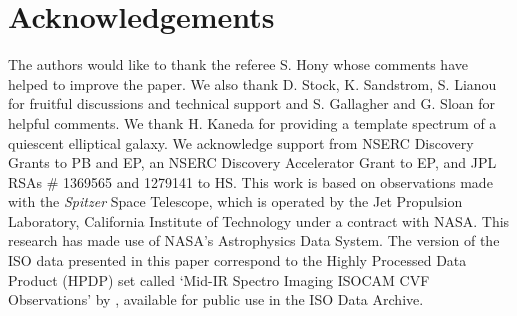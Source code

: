 \documentclass[useAMS,usenatbib,a4paper]{mn2e}
\begin{document}
\section*{Acknowledgements}
The authors would like to thank the referee S. Hony whose comments have helped to improve the paper.  We also thank D. Stock, K. Sandstrom, S. Lianou for fruitful discussions and technical support
and S. Gallagher and G. Sloan for helpful comments. We thank H. Kaneda for providing a template spectrum of a quiescent elliptical galaxy. 
We acknowledge support from NSERC Discovery Grants to PB and EP, an NSERC Discovery Accelerator Grant to EP,
and JPL RSAs \# 1369565 and 1279141 to HS.
This work is based on observations made with the {\em Spitzer} Space Telescope, which is operated by the 
Jet Propulsion Laboratory, California Institute of Technology under a contract with NASA.
This research has made use of NASA's Astrophysics Data System.
The version of the ISO data presented in this paper correspond to the Highly Processed Data Product (HPDP) set called `Mid-IR Spectro Imaging ISOCAM CVF Observations'
by \citet{Boulanger_F_2005}, available for public use in the ISO Data Archive.



{}

\bsp

\label{lastpage}
\end{document}

